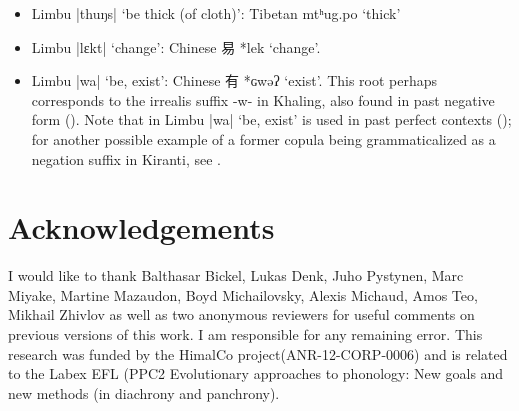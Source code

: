 \documentclass[oneside,a4paper,11pt]{article}
\newcommand{\ipa}[1]{{\phon\mbox{#1}}} %
\newcommand{\zh}[1]{{\cn #1}}
\newcommand{\dhatu}[2]{|\ipa{#1}| `#2'}
\begin{document}
\begin{itemize}
\item Limbu \dhatu{thuŋs}{be thick (of cloth)}: Tibetan \ipa{mtʰug.po} `thick'
\item Limbu \dhatu{lɛkt}{change}: Chinese \zh{易} *\ipa{lek} `change'.
\item Limbu \dhatu{wa}{be, exist}: Chinese \zh{有} *\ipa{ɢwəʔ} `exist'. This root perhaps corresponds to the irrealis suffix -\ipa{w}- in Khaling, also found in past negative form (\citealt[1101-2]{jacques12khaling}). Note that in Limbu \dhatu{wa}{be, exist} is used in past perfect contexts (\citealt[87]{michailovsky02dico}); for another possible example of a former copula being grammaticalized as a negation suffix in Kiranti, see \citet{auwera17copula}.
\end{itemize}


\section*{Acknowledgements}
 I would like to thank Balthasar Bickel, Lukas Denk, Juho Pystynen, Marc Miyake, Martine Mazaudon, Boyd Michailovsky, Alexis Michaud, Amos Teo, Mikhail Zhivlov as well as two anonymous reviewers for useful comments on previous versions of this work. I am responsible for any remaining error. This research was funded by the HimalCo project(ANR-12-CORP-0006) and is related to the Labex EFL (PPC2 Evolutionary approaches to phonology: New goals and new methods (in diachrony and panchrony).
\end{document}
